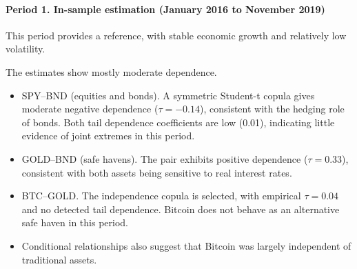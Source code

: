 \documentclass[12pt,a4paper]{article}
\begin{document}
\paragraph{Period 1. In-sample estimation (January 2016 to November 2019)}\label{sec:p1}
This period provides a reference, with stable economic growth and relatively low volatility.

The estimates show mostly moderate dependence.
\begin{itemize}
  \item SPY--BND (equities and bonds). A symmetric Student-t copula gives moderate negative dependence ($\tau=-0.14$), consistent with the hedging role of bonds. Both tail dependence coefficients are low (0.01), indicating little evidence of joint extremes in this period.
  \item GOLD--BND (safe havens). The pair exhibits positive dependence ($\tau=0.33$), consistent with both assets being sensitive to real interest rates.
  \item BTC--GOLD. The independence copula is selected, with empirical $\tau=0.04$ and no detected tail dependence. Bitcoin does not behave as an alternative safe haven in this period.
  \item Conditional relationships also suggest that Bitcoin was largely independent of traditional assets.
\end{itemize}

\begin{table}[H]
\centering
{}
\caption{Pre-COVID R-vine estimates}
\end{table}
\end{document}
